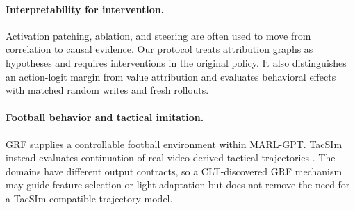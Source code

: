 \paragraph{Interpretability for intervention.}
Activation patching, ablation, and steering are often used to move from correlation to causal evidence. Our protocol treats attribution graphs as hypotheses and requires interventions in the original policy. It also distinguishes an action-logit margin from value attribution and evaluates behavioral effects with matched random writes and fresh rollouts.

\paragraph{Football behavior and tactical imitation.}
GRF supplies a controllable football environment within MARL-GPT. TacSIm instead evaluates continuation of real-video-derived tactical trajectories \cite{wen2026tacsim}. The domains have different output contracts, so a CLT-discovered GRF mechanism may guide feature selection or light adaptation but does not remove the need for a TacSIm-compatible trajectory model.
